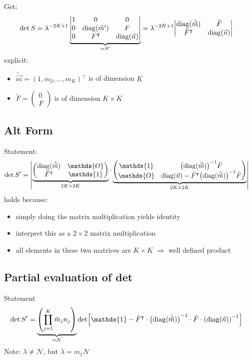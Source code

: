 \documentclass[
	english,
	a4paper,
	fontsize=10pt,
	parskip=half,
	titlepage=true,
	DIV=12,
	final
]{scrreprt}
\newcommand*{\Thus}{\ensuremath{\Rightarrow}\xspace}
\newcommand*{\transp}{\ensuremath{^\intercal}}
\DeclareMathOperator{\diag}{diag}
\begin{document}
Get:
\begin{align}
	\det S
&=
	\lambda^{-2K+1}
	\underbrace{\mqty|
		1	& 0					& 0			\\
		0	& \diag(\vec{m}')	& F			\\
		0	& F\transp			& \diag(\vec{n})
	|}_{= S'}
=
	\lambda^{-2K+1}
	\mqty|
		\diag(\tilde{\vec{m}})	& \tilde{F}			\\
		\tilde{F}\transp			& \diag(\vec{n})
	|
\end{align}
explicit:
\begin{itemize}
\item $\tilde{\vec{m}} = (1, m_2, \ldots, m_K)\transp$ is of dimension $K$
\item $\tilde{F} = \begin{pmatrix}
		0 \\ F
	\end{pmatrix}$
	is of dimension $K \times K$
\end{itemize}

\subsection{Alt Form}
Statement:
\begin{align}
	\det S'
&=
	\mqty|
		\underbrace{\begin{pmatrix}
			\diag(\tilde{\vec{m}})	& \mathds{O}			\\
			\tilde{F}\transp			& \mathds{1}
		\end{pmatrix}}_{2K \times 2K}
		\cdot
		\underbrace{\begin{pmatrix}
			\mathds{1}	&	\qty(\diag(\tilde{\vec{m}}))^{-1} \tilde{F}		\\
			\mathds{O}	&	\diag(\vec{n}) - \tilde{F}\transp \qty(\diag(\tilde{\vec{m}}))^{-1}\tilde{F}
		\end{pmatrix}}_{2K \times 2K}
	|
	\label{eqn:detProto}
\end{align}
holds because:
\begin{itemize}
\item simply doing the matrix multiplication yields identity
\item interpret this as a $2 \times 2$ matrix multiplication
\item all elements in these two matrices are $K \times K$ \Thus well defined product
\end{itemize}

\subsection{Partial evaluation of det}
Statement
\begin{align}
	\det S'
&=
	\underbrace{
		\qty( \prod_{j=1}^{K} \tilde{m}_j n_j )
	}_{= \mathcal{N} }
	\det[
		\mathds{1} -
		\tilde{F}\transp \cdot \qty( \diag(\tilde{\vec{m}}) )^{-1}
		\cdot
		\tilde{F} \cdot \qty( \diag(\vec{n}) )^{-1}
	]
\label{eqn:detSPrimePartial}
\end{align}
Note: $\lambda \neq \mathcal{N}$, but $\lambda = m_1 \mathcal{N}$
\end{document}
